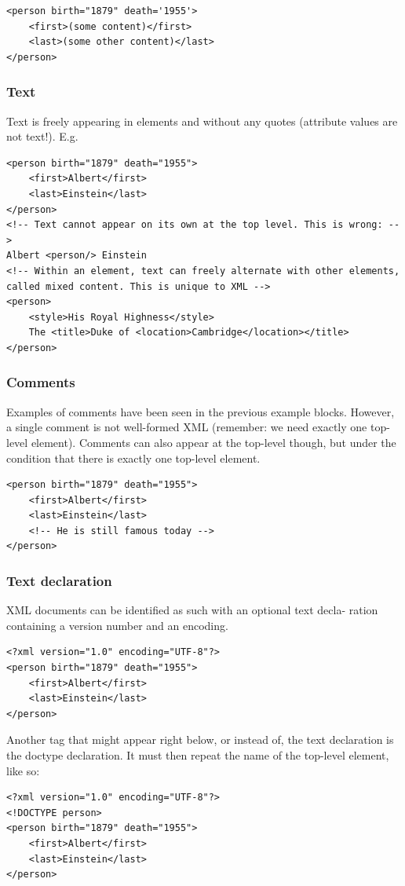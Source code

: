 \begin{lstlisting}[style=xml, caption={Example XML code}, label={lst:xml2}]
<person birth="1879" death='1955'>
    <first>(some content)</first>
    <last>(some other content)</last>
</person>
\end{lstlisting}

\subsubsection{Text}
Text is freely appearing in elements and without any quotes (attribute values are not text!). E.g.
\begin{lstlisting}[style=xml, caption={Example XML code}, label={lst:xml3}]
<person birth="1879" death="1955">
    <first>Albert</first>
    <last>Einstein</last>
</person>
<!-- Text cannot appear on its own at the top level. This is wrong: -->
Albert <person/> Einstein
<!-- Within an element, text can freely alternate with other elements, called mixed content. This is unique to XML -->
<person>
    <style>His Royal Highness</style>
    The <title>Duke of <location>Cambridge</location></title>
</person>
\end{lstlisting}

\subsubsection{Comments}
Examples of comments have been seen in the previous example blocks. However, a single comment is not well-formed XML (remember: we need exactly one top-level element). Comments can also appear at the top-level though, but under the condition that there is exactly one top-level element.
\begin{lstlisting}[style=xml, caption={Example XML code}, label={lst:xml4}]
<person birth="1879" death="1955">
    <first>Albert</first>
    <last>Einstein</last>
    <!-- He is still famous today -->
</person>
\end{lstlisting}

\subsubsection{Text declaration}
XML documents can be identified as such with an optional text decla- ration containing a version number and an encoding.
\begin{lstlisting}[style=xml, caption={Example XML code}, label={lst:xml5}]
<?xml version="1.0" encoding="UTF-8"?>
<person birth="1879" death="1955">
    <first>Albert</first>
    <last>Einstein</last>
</person>
\end{lstlisting}
Another tag that might appear right below, or instead of, the text declaration is the doctype declaration. It must then repeat the name of the top-level element, like so:
\begin{lstlisting}[style=xml, caption={Example XML code}, label={lst:xml6}]
<?xml version="1.0" encoding="UTF-8"?>
<!DOCTYPE person>
<person birth="1879" death="1955">
    <first>Albert</first>
    <last>Einstein</last>
</person>
\end{lstlisting}

